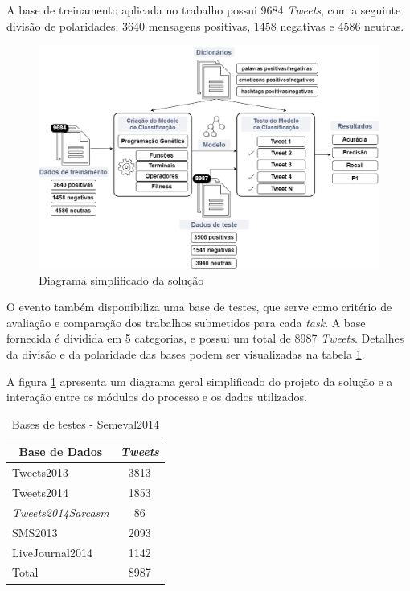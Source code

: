 \documentclass[12pt]{article}
\begin{document}
A base de treinamento aplicada no trabalho possui 9684 \emph{Tweets}, com a seguinte divisão de polaridades: 3640 mensagens positivas, 1458 negativas e 4586 neutras.

\begin{figure}[H]
	\centering
	\includegraphics[width=1\textwidth]{diagrama3}
	\caption{Diagrama simplificado da solução}
	\label{diagrama}
\end{figure}

O evento também disponibiliza uma base de testes, que serve como critério de avaliação e comparação dos trabalhos submetidos para cada \emph{task}. A base fornecida é dividida em 5 categorias, e possui um total de 8987 \emph{Tweets}. Detalhes da divisão e da polaridade das bases podem ser visualizadas na tabela \ref{datasets}.

A figura \ref{diagrama} apresenta um diagrama geral simplificado do projeto da solução e a interação entre os módulos do processo e os dados utilizados.

\begin{table}[H]
\centering
	\begin{tabular}{lc}
	\multicolumn{1}{c}{\textbf{Base de Dados}} & \textit{\textbf{Tweets}} \\ \hline
	Tweets2013 & 3813 \\ \hline
	Tweets2014 & 1853 \\ \hline
	\textit{Tweets2014Sarcasm} & 86 \\ \hline
	SMS2013 & 2093 \\ \hline
	LiveJournal2014 & 1142 \\ \hline
	Total & 8987 \\ \hline
	\end{tabular}
\caption{Bases de testes - Semeval2014}
\label{datasets}
\end{table}
\end{document}
